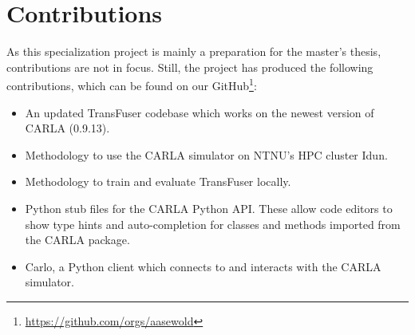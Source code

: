 \section{Contributions}

As this specialization project is mainly a preparation for the master's thesis, contributions are not in focus. Still, the project has produced the following contributions, which can be found on our GitHub\footnote{\url{https://github.com/orgs/aasewold}}:

\begin{itemize}
    \item An updated TransFuser codebase which works on the newest version of CARLA (0.9.13).
    \item Methodology to use the CARLA simulator on NTNU's HPC cluster Idun.
    \item Methodology to train and evaluate TransFuser locally.
    \item Python stub files for the CARLA Python API. These allow code editors to show type hints and auto-completion for classes and methods imported from the CARLA package.
    \item Carlo, a Python client which connects to and interacts with the CARLA simulator.
\end{itemize}
